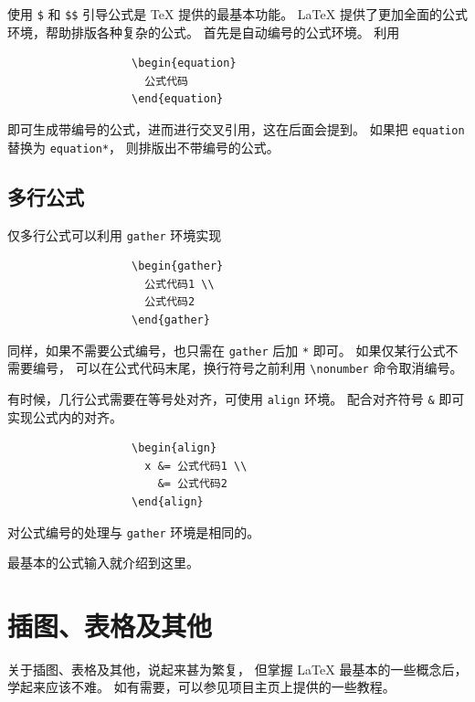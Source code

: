 使用 \verb|$| 和 \verb|$$| 引导公式是 \TeX{} 提供的最基本功能。
\LaTeX{} 提供了更加全面的公式环境，帮助排版各种复杂的公式。
首先是自动编号的公式环境。
利用

{%
\begin{verbatim}
                   \begin{equation}
                     公式代码
                   \end{equation}
\end{verbatim}}

\vspace{-0.4em}\noindent
即可生成带编号的公式，进而进行交叉引用，这在后面会提到。
如果把 \verb|equation| 替换为 \verb|equation*|，
则排版出不带编号的公式。


\subsection{多行公式}

仅多行公式可以利用 \verb|gather| 环境实现

{
\begin{verbatim}
                   \begin{gather}
                     公式代码1 \\
                     公式代码2
                   \end{gather}
\end{verbatim}}

\vspace{-0.4em}\noindent
同样，如果不需要公式编号，也只需在 \verb|gather| 后加 \verb|*| 即可。
如果仅某行公式不需要编号，
可以在公式代码末尾，换行符号之前利用 \verb|\nonumber| 命令取消编号。

有时候，几行公式需要在等号处对齐，可使用 \verb|align| 环境。
配合对齐符号 \verb|&| 即可实现公式内的对齐。
{
\begin{verbatim}
                   \begin{align}
                     x &= 公式代码1 \\
                       &= 公式代码2
                   \end{align}
\end{verbatim}}

\vspace{-0.4em}\noindent
对公式编号的处理与 \verb|gather| 环境是相同的。

最基本的公式输入就介绍到这里。


\section{插图、表格及其他}

关于插图、表格及其他，说起来甚为繁复，
但掌握 \LaTeX{} 最基本的一些概念后，学起来应该不难。
如有需要，可以参见项目主页上提供的一些教程。
